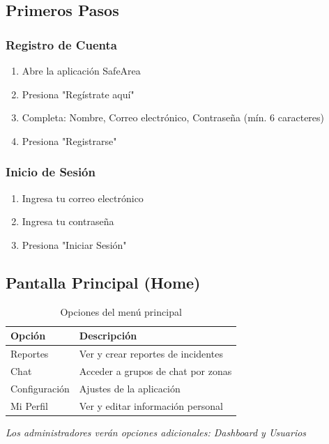 \documentclass[12pt,a4paper]{article}
\begin{document}
\subsection{Primeros Pasos}

\subsubsection{Registro de Cuenta}
\begin{enumerate}
    \item Abre la aplicación SafeArea
    \item Presiona "Regístrate aquí"
    \item Completa: Nombre, Correo electrónico, Contraseña (mín. 6 caracteres)
    \item Presiona "Registrarse"
\end{enumerate}

\subsubsection{Inicio de Sesión}
\begin{enumerate}
    \item Ingresa tu correo electrónico
    \item Ingresa tu contraseña
    \item Presiona "Iniciar Sesión"
\end{enumerate}

\subsection{Pantalla Principal (Home)}

\begin{table}[h]
\centering
\begin{tabular}{|l|l|}
\hline
\textbf{Opción} & \textbf{Descripción} \\
\hline
Reportes & Ver y crear reportes de incidentes \\
Chat & Acceder a grupos de chat por zonas \\
Configuración & Ajustes de la aplicación \\
Mi Perfil & Ver y editar información personal \\
\hline
\end{tabular}
\caption{Opciones del menú principal}
\end{table}

\textit{Los administradores verán opciones adicionales: Dashboard y Usuarios}
\end{document}
